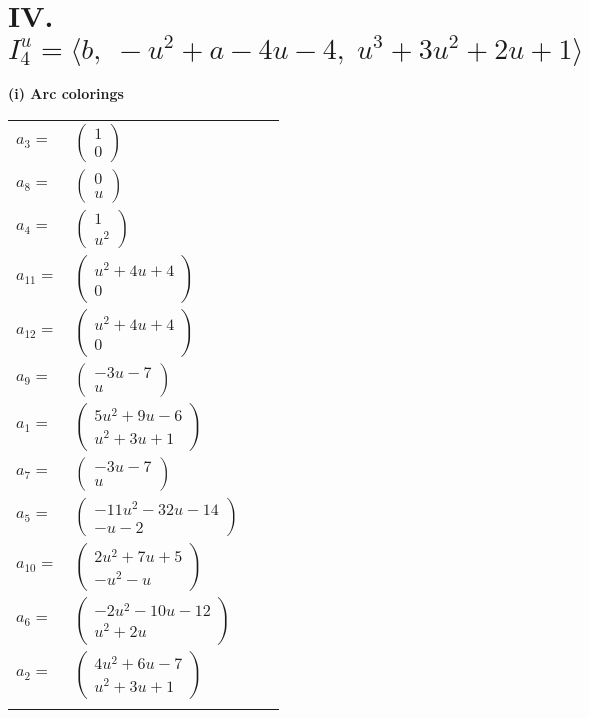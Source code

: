 \documentclass[1p]{elsarticle_modified}
\theoremstyle{definition}
\begin{document}
\centering \section*{IV. $I^u_{4}= \langle b,\;- u^2+a-4 u-4,\;u^3+3 u^2+2 u+1 \rangle$}
\flushleft \textbf{(i) Arc colorings}\\
\begin{tabular}{m{7pt} m{180pt} m{7pt} m{180pt} }
\flushright $a_{3}=$&$\begin{pmatrix}1\\0\end{pmatrix}$ \\
\flushright $a_{8}=$&$\begin{pmatrix}0\\u\end{pmatrix}$ \\
\flushright $a_{4}=$&$\begin{pmatrix}1\\u^2\end{pmatrix}$ \\
\flushright $a_{11}=$&$\begin{pmatrix}u^2+4 u+4\\0\end{pmatrix}$ \\
\flushright $a_{12}=$&$\begin{pmatrix}u^2+4 u+4\\0\end{pmatrix}$ \\
\flushright $a_{9}=$&$\begin{pmatrix}-3 u-7\\u\end{pmatrix}$ \\
\flushright $a_{1}=$&$\begin{pmatrix}5 u^2+9 u-6\\u^2+3 u+1\end{pmatrix}$ \\
\flushright $a_{7}=$&$\begin{pmatrix}-3 u-7\\u\end{pmatrix}$ \\
\flushright $a_{5}=$&$\begin{pmatrix}-11 u^2-32 u-14\\- u-2\end{pmatrix}$ \\
\flushright $a_{10}=$&$\begin{pmatrix}2 u^2+7 u+5\\- u^2- u\end{pmatrix}$ \\
\flushright $a_{6}=$&$\begin{pmatrix}-2 u^2-10 u-12\\u^2+2 u\end{pmatrix}$ \\
\flushright $a_{2}=$&$\begin{pmatrix}4 u^2+6 u-7\\u^2+3 u+1\end{pmatrix}$\\&\end{tabular}
\end{document}
